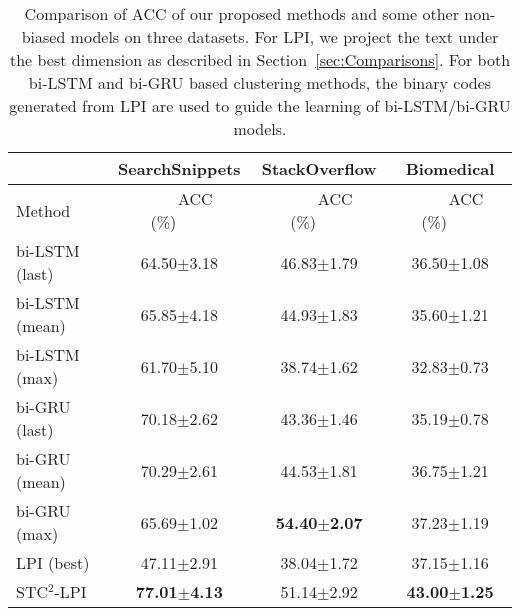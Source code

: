 \documentclass[review]{elsarticle}
\begin{document}
\begin{table*}[t] \begin{center}
\begin{tabular}{|l|c|c|c|}\hline
&SearchSnippets &StackOverflow &Biomedical\\\hline
Method     &~~~~ACC (\%)~~~~&~~~~ACC (\%)~~~~&~~~~ACC (\%)~~~~\\\hline \hline
bi-LSTM (last)& 64.50$\pm$3.18        & 46.83$\pm$1.79  & 36.50$\pm$1.08    \\
bi-LSTM (mean)& 65.85$\pm$4.18    & 44.93$\pm$1.83  & 35.60$\pm$1.21 \\
bi-LSTM (max) & 61.70$\pm$5.10     	&38.74$\pm$1.62	  &32.83$\pm$0.73\\
bi-GRU (last)& 70.18$\pm$2.62        & 43.36$\pm$1.46  & 35.19$\pm$0.78    \\
bi-GRU (mean)& 70.29$\pm$2.61    & 44.53$\pm$1.81  & 36.75$\pm$1.21 \\
bi-GRU (max) & 65.69$\pm$1.02     &	{\bf{54.40$\pm$2.07}}	  &37.23$\pm$1.19\\
\hline
LPI (best)& 47.11$\pm$2.91	& 38.04$\pm$1.72  &37.15$\pm$1.16\\
STC$^2$-LPI& {\bf{77.01$\pm$4.13}}	& 51.14$\pm$2.92	&{\bf{43.00$\pm$1.25}}\\\hline

\end{tabular}
\end{center}
\caption{\label{tb:Comparison_BIRNN} Comparison of ACC of our proposed methods and some other non-biased models on three datasets. For LPI, we project the text under the best dimension as described in Section~\ref{sec:Comparisons}. For both bi-LSTM and bi-GRU based clustering methods, the binary codes generated from LPI are used to guide the learning of bi-LSTM/bi-GRU models.}
\end{table*}
\end{document}
